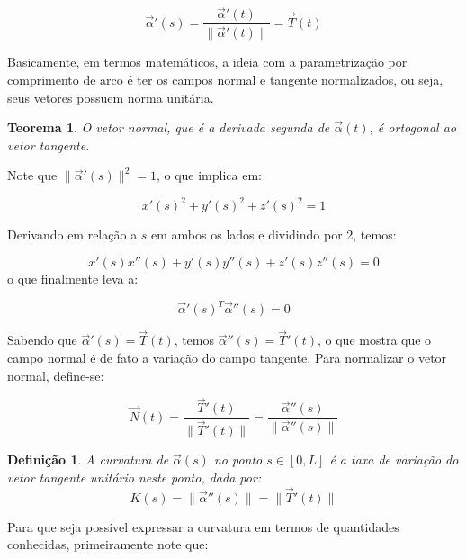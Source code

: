 \documentclass[a4paper,12pt]{article}
\newtheorem{definition}{Definição}
\newtheorem{theorem}{Teorema}
\begin{document}
\begin{equation}
	\vec{\alpha}'(s) = \frac{\vec{\alpha}'(t)}{\lVert \vec{\alpha}'(t) \rVert} = \vec{T}(t)
\end{equation}

Basicamente, em termos matemáticos, a ideia com a parametrização por comprimento de arco é ter os campos normal e tangente normalizados, ou seja, seus vetores possuem norma unitária.

\begin{theorem}
O vetor normal, que é a derivada segunda de $\vec{\alpha}(t)$, é ortogonal ao vetor tangente.
\end{theorem}

Note que $\lVert \vec{\alpha}'(s) \rVert^2 = 1$, o que implica em:

\begin{equation}
	x'(s)^2 + y'(s)^2 + z'(s)^2 = 1
\end{equation}

Derivando em relação a $s$ em ambos os lados e dividindo por 2, temos:

\begin{equation}
	x'(s)x''(s) + y'(s)y''(s) + z'(s)z''(s) = 0
\end{equation} o que finalmente leva a:

\begin{equation}
	\vec{\alpha}'(s)^T \vec{\alpha}''(s) = 0
\end{equation}

Sabendo que $\vec{\alpha}'(s) = \vec{T}(t)$, temos $\vec{\alpha}''(s) = \vec{T}'(t)$, o que mostra que o campo normal é de fato a variação do campo tangente. Para normalizar o vetor normal, define-se:

\begin{equation}
	\vec{N}(t) = \frac{\vec{T}'(t)}{\lVert \vec{T}'(t) \rVert} = \frac{\vec{\alpha}''(s)}{\lVert \vec{\alpha}''(s) \rVert}
\end{equation}

\begin{definition}
A curvatura de $\vec{\alpha}(s)$ no ponto $s \in [0, L]$ é a taxa de variação do vetor tangente unitário neste ponto, dada por:
\begin{equation}
	K(s) = \lVert \vec{\alpha}''(s) \rVert = \lVert \vec{T}'(t) \rVert
\end{equation}
\end{definition}

Para que seja possível expressar a curvatura em termos de quantidades conhecidas, primeiramente note que:
\end{document}
